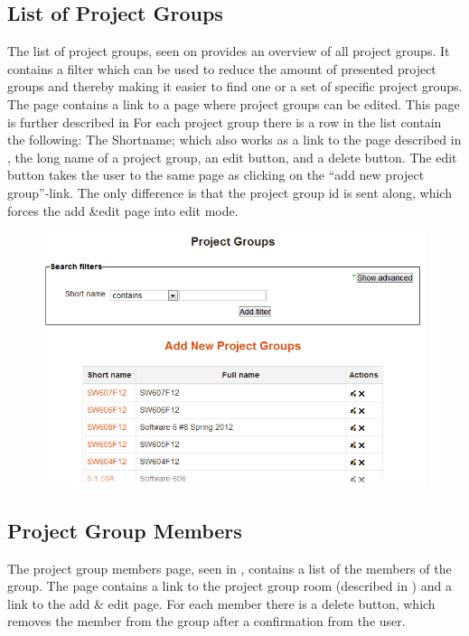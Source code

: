 \subsection{List of Project Groups}
\label{sec:preListPg}
The list of project groups, seen on \figref{} provides an overview of all project groups. 
It contains a filter which can be used to reduce the amount of presented project groups and thereby making it easier to find one or a set of specific project groups. 
The page contains a link to a page where project groups can be edited. 
This page is further described in 
For each project group there is a row in the list contain the following: The Shortname; which also works as a link to the page described in , the long name of a project group, an edit button, and a delete button. 
The edit button takes the user to the same page as clicking on the ``add new project group''-link. 
The only difference is that the project group id is sent along, which forces the add \&edit page into edit mode. 

\begin{figure}
	\centering
		\includegraphics[width=\textwidth]{images/moodleadminprojectgrouplist.png}
	\label{fig:moodleadminprojectgrouplist}
\end{figure}
\FloatBarrier

\subsection{Project Group Members}
\label{sec:projectGrpMem}
The project group members page, seen in , contains a list of the members of the group. 
The page contains a link to the project group room (described in \secref{}) and a link to the add \& edit page. 
For each member there is a delete button, which removes the member from the group after a confirmation from the user.

